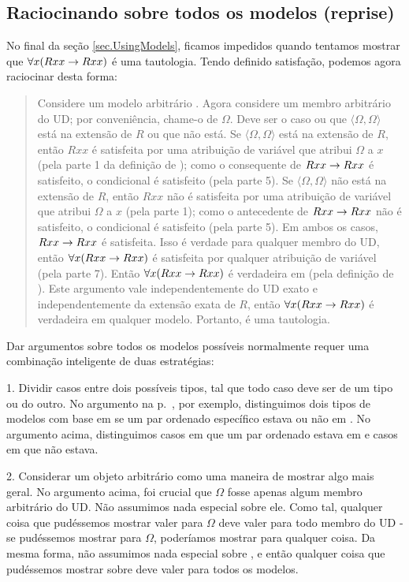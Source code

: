 \subsection{Raciocinando sobre todos os modelos (reprise)}
No final da seção \ref{sec.UsingModels}, ficamos impedidos quando tentamos mostrar que $\forall x(Rxx\rightarrow Rxx)$ é uma tautologia. Tendo definido satisfação, podemos agora raciocinar desta forma:
\begin{quote}
Considere um modelo arbitrário . Agora considere um membro arbitrário do UD; por conveniência, chame-o de $\Omega$. Deve ser o caso ou que $\langle\Omega,\Omega\rangle$ está na extensão de $R$ ou que não está. Se $\langle\Omega,\Omega\rangle$ está na extensão de $R$, então $Rxx$ é satisfeita por uma atribuição de variável que atribui $\Omega$ a $x$ (pela parte 1 da definição de ); como o consequente de $Rxx\rightarrow Rxx$ é satisfeito, o condicional é satisfeito (pela parte 5). Se $\langle\Omega,\Omega\rangle$ não está na extensão de $R$, então $Rxx$ não é satisfeita por uma atribuição de variável que atribui $\Omega$ a $x$ (pela parte 1); como o antecedente de $Rxx\rightarrow Rxx$ não é satisfeito, o condicional é satisfeito (pela parte 5). Em ambos os casos, $Rxx\rightarrow Rxx$ é satisfeita. Isso é verdade para qualquer membro do UD, então $\forall x(Rxx \rightarrow Rxx)$ é satisfeita por qualquer atribuição de variável (pela parte 7). Então $\forall x(Rxx \rightarrow Rxx)$ é verdadeira em  (pela definição de ). Este argumento vale independentemente do UD exato e independentemente da extensão exata de $R$, então $\forall x(Rxx \rightarrow Rxx)$ é verdadeira em qualquer modelo. Portanto, é uma tautologia.
\end{quote}

Dar argumentos sobre todos os modelos possíveis normalmente requer uma combinação inteligente de duas estratégias:

1. Dividir casos entre dois possíveis tipos, tal que todo caso deve ser de um tipo ou do outro. No argumento na p.~\pageref{allmodels1}, por exemplo, distinguimos dois tipos de modelos com base em se um par ordenado específico estava ou não em . No argumento acima, distinguimos casos em que um par ordenado estava em  e casos em que não estava.

2. Considerar um objeto arbitrário como uma maneira de mostrar algo mais geral. No argumento acima, foi crucial que $\Omega$ fosse apenas algum membro arbitrário do UD. Não assumimos nada especial sobre ele. Como tal, qualquer coisa que pudéssemos mostrar valer para $\Omega$ deve valer para todo membro do UD - se pudéssemos mostrar para $\Omega$, poderíamos mostrar para qualquer coisa. Da mesma forma, não assumimos nada especial sobre , e então qualquer coisa que pudéssemos mostrar sobre  deve valer para todos os modelos.

